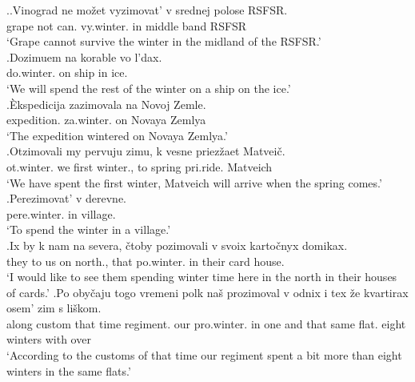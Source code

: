 \ex.\label{ex:zimovat'}\ag.\label{ex:vyzimovat'}Vinograd ne mo\v{z}et vyzimovat' v srednej polose RSFSR.\\
grape not can. vy.winter. in middle band RSFSR\\
\trans `Grape cannot survive the winter in the midland of the RSFSR.'\\
\bg.\label{ex:dozimovat'}Dozimuem na korable vo l'dax.\\
do.winter. on ship in ice.\\
\trans `We will spend the rest of the winter on a ship on the ice.'\\
\bg.\label{ex:zazimovat'}\`{E}kspedicija zazimovala na Novoj Zemle.\\
expedition. za.winter. on Novaya Zemlya\\
\trans `The expedition wintered on Novaya Zemlya.'\\
\bg.\label{ex:otzimovat'}Otzimovali my pervuju zimu, k vesne priez\v{z}aet Matvei\v{c}.\\
ot.winter. we first winter., to spring pri.ride. Matveich\\
\trans `We have spent the first winter, Matveich will arrive when the spring comes.'
\bg.\label{ex:perezimovat'}Perezimovat' v derevne.\\
pere.winter. in village.\\
\trans `To spend the winter in a village.'\\
\bg.\label{ex:pozimovat'}Ix by k nam na severa, \v{c}toby pozimovali v svoix karto\v{c}nyx domikax.\\
they {} to us on north., that po.winter. in their card house.\\
\trans `I would like to see them spending winter time here in the north in their houses of cards.'
\bg.\label{ex:prozimovat'}Po oby\v{c}aju togo vremeni polk na\v{s} prozimoval v odnix i tex \v{z}e kvartirax osem' zim s li\v{s}kom.\\
along custom that time regiment. our pro.winter. in one and that same flat. eight winters with over\\
\trans `According to the customs of that time our regiment spent a bit more than eight winters in the same flats.'\\

